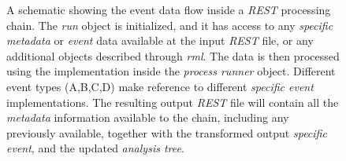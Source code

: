 \begin{figure}[htb!]
  \centering
	\caption{A schematic showing the event data flow inside a \emph{REST} processing chain. The \emph{run} object is initialized, and it has access to any \emph{specific metadata} or \emph{event} data available at the input \emph{REST} file, or any additional objects described through \emph{rml}. The data is then processed using the implementation inside the \emph{process runner} object. Different event types (A,B,C,D) make reference to different \emph{specific event} implementations. The resulting output \emph{REST} file will contain all the \emph{metadata} information available to the chain, including any previously available, together with the transformed output \emph{specific event}, and the updated \emph{analysis tree}.  }\label{fig:processing}
\end{figure}




